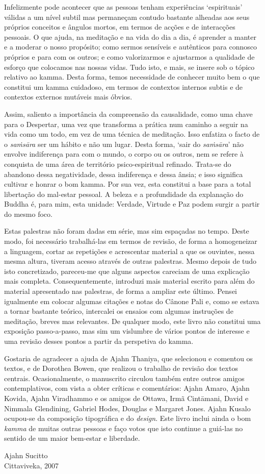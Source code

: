 Infelizmente pode acontecer que as pessoas tenham experiências `espirituais'
válidas a um nível subtil mas permaneçam contudo bastante alheadas aos seus
próprios conceitos e ângulos mortos, em termos de acções e de interacções
pessoais. O que ajuda, na meditação e na vida do dia a dia, é aprender a manter
e a moderar o nosso propósito; como sermos sensíveis e autênticos para connosco
próprios e para com os outros; e como valorizarmos e ajustarmos a qualidade de
esforço que colocamos nas nossas vidas. Tudo isto, e mais, se insere sob o
tópico relativo ao kamma. Desta forma, temos necessidade de conhecer muito bem o
que constitui um kamma cuidadoso, em termos de contextos internos subtis e de
contextos externos mutáveis mais óbvios.

Assim, saliento a importância da compreensão da causalidade, como uma chave para
o Despertar, uma vez que transforma a prática num caminho a seguir na vida como
um todo, em vez de uma técnica de meditação. Isso enfatiza o facto de o
\emph{saṁsāra} ser um hábito e não um lugar. Desta forma, `sair do
\emph{saṁsāra}' não envolve indiferença para com o mundo, o corpo ou os outros,
nem se refere à conquista de uma área de território psico-espiritual refinado.
Trata-se do abandono dessa negatividade, dessa indiferença e dessa ânsia; e isso
significa cultivar e honrar o bom kamma. Por sua vez, esta constitui a base para
a total libertação do mal-estar pessoal. A beleza e a profundidade da explanação
do Buddha é, para mim, esta unidade: Verdade, Virtude e Paz podem surgir a
partir do mesmo foco.

Estas palestras não foram dadas em série, mas sim espaçadas no tempo. Deste
modo, foi necessário trabalhá-las em termos de revisão, de forma a homogeneizar
a linguagem, cortar as repetições e acrescentar material a que os ouvintes,
nessa mesma altura, tiveram acesso através de outras palestras. Mesmo depois de
tudo isto concretizado, pareceu-me que alguns aspectos careciam de uma
explicação mais completa. Consequentemente, introduzi mais material escrito para
além do material apresentado nas palestras, de forma a ampliar este último.
Pensei igualmente em colocar algumas citações e notas do Cânone Pali e, como se
estava a tornar bastante teórico, intercalei os ensaios com algumas instruções
de meditação, breves mas relevantes. De qualquer modo, este livro não constitui
uma exposição passo-a-passo, mas sim um vislumbre de vários pontos de interesse
e uma revisão desses pontos a partir da perspetiva do kamma.

Gostaria de agradecer a ajuda de Ajahn Thaniya, que selecionou e comentou os
textos, e de Dorothea Bowen, que realizou o trabalho de revisão dos textos
centrais. Ocasionalmente, o manuscrito circulou também entre outros amigos
contemplativos, com vista a obter críticas e comentários: Ajahn Amaro, Ajahn
Kovida, Ajahn Viradhammo e os amigos de Ottawa, Irmã Cintāmani, David e Nimmala
Glendining, Gabriel Hodes, Douglas e Margaret Jones. Ajahn Kusalo ocupou-se da
composição tipográfica e do \emph{design}. Este livro inclui ainda o bom
\emph{kamma} de muitas outras pessoas e faço votos que isto continue a guiá-las
no sentido de um maior bem-estar e liberdade.

\bigskip

{\raggedleft
Ajahn Sucitto\\
Cittaviveka, 2007
\par}
